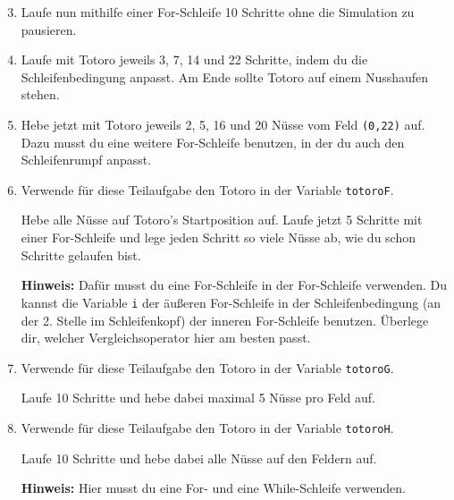 \begin{enumerate}\setcounter{enumi}{2}
	\item
	Laufe nun mithilfe einer For-Schleife 10 Schritte ohne die Simulation zu pausieren.

	\item
	Laufe mit Totoro jeweils 3, 7, 14 und 22 Schritte, indem du die Schleifenbedingung anpasst.
	Am Ende sollte Totoro auf einem Nusshaufen stehen.
	
	\item
	Hebe jetzt mit Totoro jeweils 2, 5, 16 und 20 Nüsse vom Feld \texttt{(0,22)} auf.
	Dazu musst du eine weitere For-Schleife benutzen, in der du auch den Schleifenrumpf anpasst.
	
	\item
	Verwende für diese Teilaufgabe den Totoro in der Variable \lstinline{totoroF}.
	
	Hebe alle Nüsse auf Totoro's Startposition auf.
	Laufe jetzt 5 Schritte mit einer For-Schleife und lege jeden Schritt so viele Nüsse ab, wie du schon Schritte gelaufen bist.
	
	\textbf{Hinweis:} Dafür musst du eine For-Schleife in der For-Schleife verwenden.
	Du kannst die Variable \lstinline{i} der äußeren For-Schleife in der Schleifenbedingung (an der 2. Stelle im Schleifenkopf) der inneren For-Schleife benutzen.
	Überlege dir, welcher Vergleichsoperator hier am besten passt.
	
	\item
	Verwende für diese Teilaufgabe den Totoro in der Variable \lstinline{totoroG}.
	
	Laufe 10 Schritte und hebe dabei maximal 5 Nüsse pro Feld auf.
	
	\item
	Verwende für diese Teilaufgabe den Totoro in der Variable \lstinline{totoroH}.
	
	Laufe 10 Schritte und hebe dabei alle Nüsse auf den Feldern auf.
	
	\textbf{Hinweis:} Hier musst du eine For- und eine While-Schleife verwenden.
\end{enumerate}
\newpage
